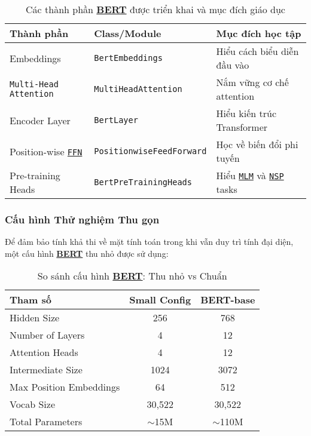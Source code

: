     \begin{table}[H]
    \centering
    \caption{Các thành phần \hyperref[acro:bert]{\textbf{BERT}} được triển khai và mục đích giáo dục}
    \label{tab:bert_components}
    \begin{tabular}{lll}
    \toprule
    \textbf{Thành phần} & \textbf{Class/Module} & \textbf{Mục đích học tập} \\
    \midrule
    Embeddings & \texttt{BertEmbeddings} & Hiểu cách biểu diễn đầu vào \\
    \texttt{Multi-Head Attention} & \texttt{MultiHeadAttention} & Nắm vững cơ chế attention \\
    Encoder Layer & \texttt{BertLayer} & Hiểu kiến trúc Transformer
    \\
    Position-wise \hyperref[acro:ffn]{\texttt{FFN}} & \texttt{PositionwiseFeedForward} & Học về biến đổi phi tuyến \\
    Pre-training Heads & \texttt{BertPreTrainingHeads} & Hiểu \hyperref[acro:mlm]{\texttt{MLM}} và \hyperref[acro:nsp]{\texttt{NSP}} tasks \\
    \bottomrule
    \end{tabular}
    \end{table}
    
    \subsubsection{Cấu hình Thử nghiệm Thu gọn}
    Để đảm bảo tính khả thi về mặt tính toán trong khi vẫn duy trì tính đại diện, một cấu hình \hyperref[acro:bert]{\textbf{BERT}} thu nhỏ được sử dụng:
    
    \begin{table}[H]
    \centering
    \caption{So sánh cấu hình \hyperref[acro:bert]{\textbf{BERT}}: Thu nhỏ vs Chuẩn}
    \label{tab:bert_config_comparison}
    \begin{tabular}{lcc}
    \toprule
    \textbf{Tham số} & \textbf{Small Config} & \textbf{BERT-base} \\
    \midrule
    Hidden Size & 256 & 768 \\
    Number of Layers & 4 & 12 \\
    Attention Heads & 4 & 12 \\
    Intermediate Size & 1024 & 3072 \\
    Max Position Embeddings & 64 & 512 \\
    Vocab
    Size & 30,522 & 30,522 \\
    Total Parameters & $\sim$15M & $\sim$110M \\
    \bottomrule
    \end{tabular}
    \end{table}
    
